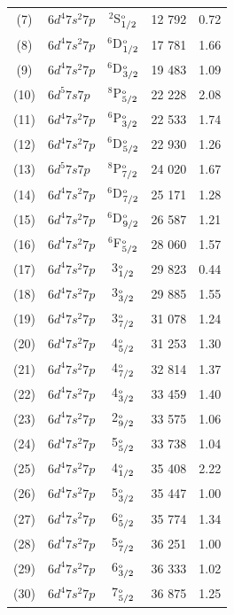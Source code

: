 \documentclass[10pt,a4paper, twoside, openright]{report}
\begin{document}
{\begin{longtable}{cl@{\hspace{0.5cm}}c@{\hspace{0.5cm}}r@{\hspace{0.5cm}}r}
(7) &   $6d^4 7s^2 7p $  &  $^2$S$_{1/2}^{\rm_o}$    & 12 792 & 0.72 \\  
(8) &   $6d^4 7s^2 7p $   &  $^6$D$_{1/2}^{\rm_o}$   & 17 781 & 1.66 \\  
 (9) &   $6d^4 7s^2 7p $   &  $^6$D$_{3/2}^{\rm_o}$    & 19 483 & 1.09 \\  
(10) &   $6d^5 7s 7p$  &  $^8$P$_{5/2}^{\rm_o}$    & 22 228 & 2.08 \\  
(11) &   $6d^4 7s^2 7p $   &  $^6$P$_{3/2}^{\rm_o}$    & 22 533 & 1.74 \\  
(12) &   $6d^4 7s^2 7p $   &  $^6$D$_{5/2}^{\rm_o}$    & 22 930 & 1.26 \\  
 (13) &   $6d^5 7s 7p$  &  $^8$P$_{7/2}^{\rm_o}$    & 24 020 & 1.67 \\ 
(14)   &   $6d^4 7s^2 7p $   &  $^6$D$_{7/2}^{\rm_o}$    & 25 171 & 1.28 \\  
(15)  &   $6d^4 7s^2 7p $   &  $^6$D$_{9/2}^{\rm_o}$    & 26 587 & 1.21 \\  
 (16) &   $6d^4 7s^2 7p $  &  $^6$F$_{5/2}^{\rm_o}$    & 28 060 & 1.57 \\  
 (17) &  $6d^4 7s^2 7p $  & 3$_{1/2}^{\rm_o}$  & 29 823 & 0.44 \\ 
(18) &   $6d^4 7s^2 7p $ &  3$_{3/2}^{\rm_o}$  & 29 885 & 1.55 \\
(19) &  $6d^4 7s^2 7p $  & 3$_{7/2}^{\rm_o}$  & 31 078 & 1.24 \\ 
(20) &   $6d^4 7s^2 7p $ & 4$_{5/2}^{\rm_o}$  & 31 253 & 1.30 \\ 
(21) &   $6d^4 7s^2 7p $  & 4$_{7/2}^{\rm_o}$  & 32 814 & 1.37 \\ 
(22) &  $6d^4 7s^2 7p $  & 4$_{3/2}^{\rm_o}$  & 33 459 & 1.40 \\
(23) & $6d^4 7s^2 7p $  & 2$_{9/2}^{\rm_o}$  & 33 575 & 1.06 \\
(24) & $6d^4 7s^2 7p $  & 5$_{5/2}^{\rm_o}$     & 33 738 & 1.04 \\
(25) & $6d^4 7s^2 7p $  &  4$_{1/2}^{\rm_o}$  & 35 408 & 2.22 \\
(26) & $6d^4 7s^2 7p $  & 5$_{3/2}^{\rm_o}$   & 35 447 & 1.00 \\
(27) & $6d^4 7s^2 7p $  & 6$_{5/2}^{\rm_o}$  & 35 774 & 1.34 \\
(28) & $6d^4 7s^2 7p $  & 5$_{7/2}^{\rm_o}$   & 36 251 & 1.00 \\
(29) & $6d^4 7s^2 7p $  & 6$_{3/2}^{\rm_o}$    & 36 333 & 1.02 \\
(30) & $6d^4 7s^2 7p $  & 7$_{5/2}^{\rm_o}$    & 36 875 & 1.25 \\

\end{longtable}}
\end{document}
